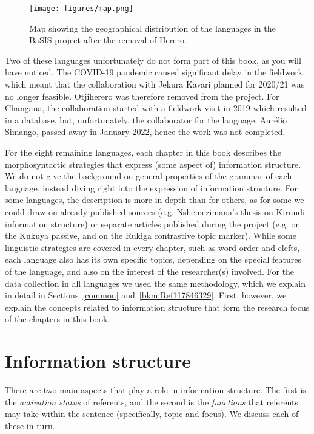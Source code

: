 \documentclass[output=paper]{langscibook}
\begin{document}
  
\begin{figure}
\texttt{[image: figures/map.png]}
\caption{Map showing the geographical distribution of the languages in the BaSIS project after the removal of Herero.}
\label{fig:langmap}
\end{figure}

Two of these languages unfortunately do not form part of this book, as you will have noticed. The COVID-19 pandemic caused significant delay in the fieldwork, which meant that the collaboration with Jekura Kavari planned for 2020/21 was no longer feasible. Otjiherero was therefore removed from the project. For Changana, the collaboration started with a fieldwork visit in 2019 which resulted in a database, but, unfortunately, the collaborator for the language, Aurélio Simango, passed away in January 2022, hence the work was not completed.

For the eight remaining languages, each chapter in this book describes the morphosyntactic strategies that express (some aspect of) information structure. We do not give the background on general properties of the grammar of each language, instead diving right into the expression of information structure. For some languages, the description is more in depth than for others, as for some we could draw on already published sources (e.g. Nshemezimana’s \citeyear{Nshemezimana2016} thesis on Kirundi information structure) or separate articles published during the project (e.g. \citealt{Li2020} on the Kukuya passive, and \citealt{AsiimwevanderWal2021} on the Rukiga contrastive topic marker). While some linguistic strategies are covered in every chapter, such as word order and clefts, each language also has its own specific topics, depending on the special features of the language, and also on the interest of the researcher(s) involved. For the data collection in all languages we used the same methodology, which we explain in detail in Sections~\ref{common} and~\ref{bkm:Ref117846329}. First, however, we explain the concepts related to information structure that form the research focus of the chapters in this book.

\section{Information structure}
\label{sec:3:is}
There are two main aspects that play a role in information structure. The first is the \textit{activation status} of referents, and the second is the \textit{functions} that referents may take within the sentence (specifically, topic and focus). We discuss each of these in turn.
\end{document}
